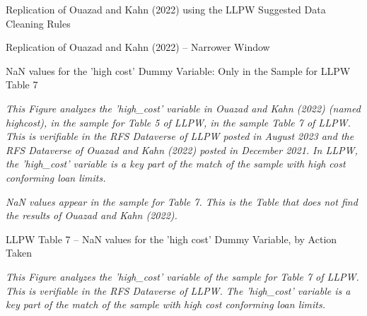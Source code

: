 \documentclass{article}
\begin{document}
\begin{table}

\caption{Replication of Ouazad and Kahn (2022) using the LLPW Suggested Data Cleaning Rules}

\begin{center}

\end{center}


\end{table}

\clearpage
\pagebreak

\begin{table}

\caption{Replication of Ouazad and Kahn (2022) – Narrower Window}


\begin{center}

\end{center}

\end{table}

\clearpage
\pagebreak

\begin{table}

\caption{NaN values for the 'high cost' Dummy Variable: Only in the Sample for LLPW Table 7}

\emph{This Figure analyzes the 'high\_cost' variable in Ouazad and Kahn (2022) (named highcost), in the sample for Table 5 of LLPW, in the sample Table 7 of LLPW. This is verifiable in the RFS Dataverse of LLPW posted in August 2023 and the RFS Dataverse of Ouazad and Kahn (2022) posted in December 2021. In LLPW, the 'high\_cost' variable is a key part of the match of the sample with high cost conforming loan limits.}

\begin{center}

\end{center}

\emph{NaN values appear in the sample for Table 7. This is the Table that does not find the results of Ouazad and Kahn (2022).}

\end{table}

\begin{table}
\caption{LLPW Table 7 -- NaN values for the 'high cost' Dummy Variable, by Action Taken}

\emph{This Figure analyzes the 'high\_cost' variable of the sample for Table 7 of LLPW. This is verifiable in the RFS Dataverse of LLPW. The 'high\_cost' variable is a key part of the match of the sample with high cost conforming loan limits.}

\begin{center}

\end{center}

\end{table}
\end{document}
